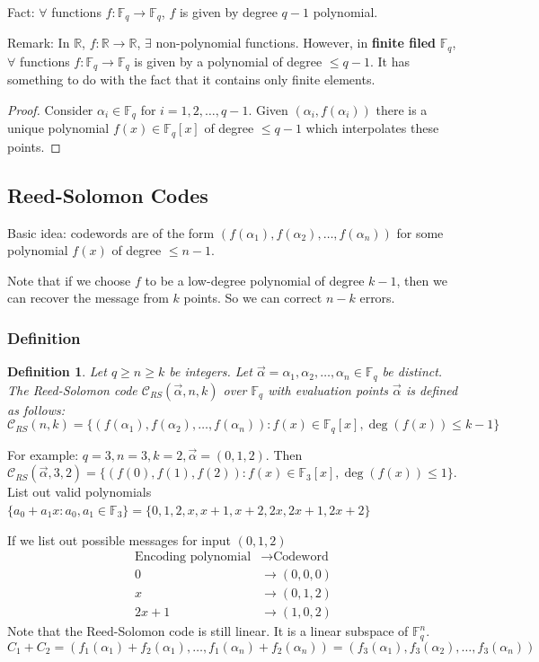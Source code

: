 \documentclass[letterpaper,12pt]{article}
\newtheorem{definition}{Definition}
\begin{document}
Fact: $\forall$ functions $f:\mathbb{F}_q\to \mathbb{F}_q$, $f$ is given by
degree $q-1$ polynomial.

Remark: In $\mathbb{R}$, $f:\mathbb{R}\to \mathbb{R}$, $\exists$ non-polynomial
functions. However, in \textbf{finite filed} $\mathbb{F}_q$, $\forall$
functions $f:\mathbb{F}_q\to \mathbb{F}_q$ is given by a polynomial of degree
$\le q-1$. It has something to do with the fact that it contains only finite
elements.
\begin{proof}
    Consider $\alpha_i\in \mathbb{F}_q$ for $i=1,2,\ldots,q-1$. Given $(\alpha_i,f(\alpha_i))$ there is a unique polynomial $f(x)\in \mathbb{F}_q[x]$ of degree $\le q-1$ which interpolates these points.
\end{proof}

\subsection{Reed-Solomon Codes}
Basic idea: codewords are of the form
$(f(\alpha_1),f(\alpha_2),\ldots,f(\alpha_n))$ for some polynomial $f(x)$ of
degree $\le n-1$.

Note that if we choose $f$ to be a low-degree polynomial of degree $k-1$, then
we can recover the message from $k$ points. So we can correct $n-k$ errors.
\subsubsection{Definition}
\begin{definition}
    Let $q\ge n \ge k$ be integers. Let $\vec{\alpha}=\alpha_1,\alpha_2,\ldots,\alpha_n\in \mathbb{F}_q$ be distinct. The Reed-Solomon code $\mathcal{C}_{RS}(\vec{\alpha}, n,k)$ over $\mathbb{F}_q$ with evaluation points $\vec{\alpha}$ is defined as follows: \[
        \mathcal{C}_{RS}(n,k)=\{(f(\alpha_1),f(\alpha_2),\ldots,f(\alpha_n)): f(x)\in \mathbb{F}_q[x], \deg(f(x))\le k-1\}
    \]
\end{definition}
For example: $q=3, n=3, k=2, \vec{\alpha}=(0,1,2)$. Then $\mathcal{C}_{RS}(\vec{\alpha},3,2)=\{(f(0),f(1),f(2)): f(x)\in \mathbb{F}_3[x], \deg(f(x))\le 1\}$. List out valid polynomials $\{a_0+a_1 x: a_0,a_1\in\mathbb{F}_3\} = \{0,1,2,x,x+1,x+2,2x,2x+1,2x+2\}$

If we list out possible messages for input $(0,1,2)$
\begin{align*}
    \text{Encoding polynomial} & \to \text{Codeword} \\
    0                          & \to (0,0,0)         \\
    x                          & \to (0,1,2)         \\
    2x+1                       & \to (1,0,2)
\end{align*}
Note that the Reed-Solomon code is still linear. It is a linear subspace of $\mathbb{F}_q^n$. \[
    C_1+C_2 = (f_1(\alpha_1)+f_2(\alpha_1),\ldots,f_1(\alpha_n)+f_2(\alpha_n))=(f_3(\alpha_1),f_3(\alpha_2),\ldots,f_3(\alpha_n))
\]
\end{document}
